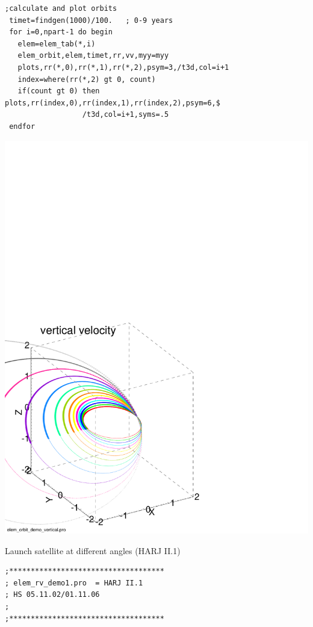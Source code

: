 \documentclass[a4paper,12pt]{article}
\def\red{\color{red}}
\def\black{\color{RGBblack}}
\begin{document}
{{{{\begin{verbatim}
;calculate and plot orbits
 timet=findgen(1000)/100.   ; 0-9 years
 for i=0,npart-1 do begin
   elem=elem_tab(*,i)
   elem_orbit,elem,timet,rr,vv,myy=myy
   plots,rr(*,0),rr(*,1),rr(*,2),psym=3,/t3d,col=i+1
   index=where(rr(*,2) gt 0, count)
   if(count gt 0) then plots,rr(index,0),rr(index,1),rr(index,2),psym=6,$
                  /t3d,col=i+1,syms=.5
 endfor
\end{verbatim}
\black}



\vspace{-8cm}
\includegraphics[height=0.8\paperwidth]{demo_apu2.pdf}

\newpage
\black
\bul 
Launch satellite at different angles (HARJ II.1)  

{\red \scriptsize 
\begin{verbatim}
;************************************
; elem_rv_demo1.pro  = HARJ II.1
; HS 05.11.02/01.11.06
;
;************************************


\end{verbatim}}}}}
\end{document}
